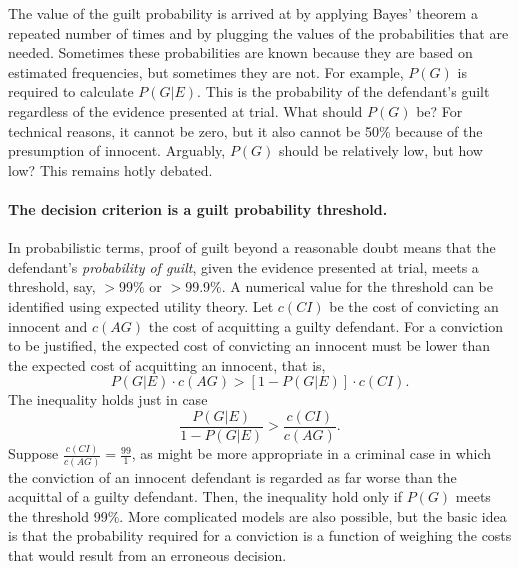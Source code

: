 \documentclass[10pt]{article}
\begin{document}
The value of the guilt probability is arrived at by applying Bayes' theorem a 
repeated number of times and by plugging the values of the probabilities that are needed. 
Sometimes these probabilities are known because they are based on estimated frequencies, but sometimes 
they are not. For example, $P(G)$ is required to calculate $P(G|E)$. 
This is the probability of the defendant's guilt regardless of the evidence 
presented at trial. What should $P(G)$ be?
For technical reasons, it cannot be zero, but it also cannot be 50\% because 
of the presumption of innocent. Arguably, $P(G)$ should be relatively low, but how low?
This remains  hotly debated. 


\paragraph{The decision criterion is a guilt probability threshold.}

In probabilistic terms, proof of guilt beyond a reasonable doubt means 
that the defendant's \textit{probability of guilt}, given the evidence presented at trial, meets a 
threshold, say, $>$99\% or $>$99.9\%. 
%
A numerical value for the threshold can be identified using expected utility theory. 
Let $c(CI)$ be the cost of convicting an innocent and $c(AG)$ the cost 
of acquitting a guilty defendant. For a conviction to be justified, the 
expected cost of convicting an innocent must be lower than the expected 
cost of acquitting an innocent, that is, 
%
\[ P(G|E) \cdot c(AG) >  [1-P(G|E)] \cdot c(CI) .\]
%
The inequality holds just in case 
%
\[ \frac{P(G|E)}{1- P(G|E)} > \frac{c(CI)}{c(AG)}.\]
%
Suppose $ \frac{c(CI)}{c(AG)}=\frac{99}{1}$, as might be more appropriate in a criminal 
case in which the conviction of an innocent defendant is regarded as far worse than the acquittal of a guilty defendant.
Then, the inequality hold only if $P(G)$ meets the threshold 99\%.
More complicated models are also possible, but the basic idea is that the probability 
required for a conviction is a function of weighing the 
costs that would result from an erroneous decision. 
\end{document}
